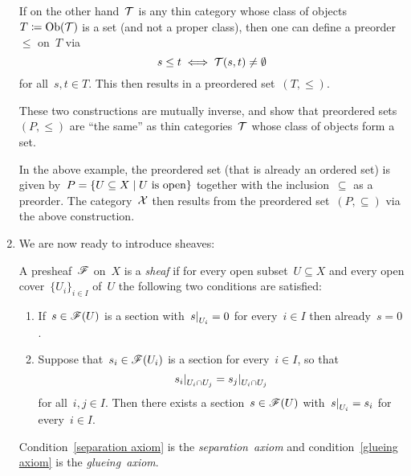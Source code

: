 \begin{example}
\begin{enumerate}
\begin{remark*}
        If on the other hand~$\mathcal{T}$ is any thin category whose class of objects~$T \coloneqq \operatorname{Ob}(\mathcal{T})$ is a set (and not a proper class), then one can define a preorder~$\leq$ on~$T$ via
        \[
                s \leq t
          \iff  \mathcal{T}(s,t) \neq \emptyset
        \]
        for all~$s, t \in T$.
        This then results in a preordered set~$(T, \leq)$.
        
        These two constructions are mutually inverse, and show that preordered sets~$(P,\leq)$ are \enquote{the same} as thin categories~$\mathcal{T}$ whose class of objects form a set.
        
        In the above example, the preordered set (that is already an ordered set) is given by~$P = \{U \subseteq X \suchthat \text{$U$ is open}\}$ together with the inclusion~$\subseteq$ as a preorder.
        The category~$\mathcal{X}$ then results from the preordered set~$(P, \subseteq)$ via the above construction.
      \end{remark*}
      
    \item
      We are now ready to introduce sheaves:
      
      \begin{definitionnonum}
        A presheaf~$\mathscr{F}$ on~$X$ is a \emph{sheaf} if for every open subset~$U \subseteq X$ and every open cover~$\{ U_i \}_{i \in I}$ of~$U$ the following two conditions are satisfied:
        \begin{enumerate}[label=(S\arabic*)]
          \item
            \label{separation axiom}
            If~$s \in \mathscr{F}(U)$ is a section with~$\restrict{s}{U_i} = 0$ for every~$i \in I$ then already~$s = 0$.
          \item
            \label{glueing axiom}
            Suppose that~$s_i \in \mathscr{F}(U_i)$ is a section for every~$i \in I$, so that
            \[
                \restrict{s_i}{U_i \cap U_j}
              = \restrict{s_j}{U_i \cap U_j}
            \]
            for all~$i, j \in I$.
            Then there exists a section~$s \in \mathscr{F}(U)$ with~$\restrict{s}{U_i} = s_i$ for every~$i \in I$.
        \end{enumerate}
        Condition~\ref*{separation axiom} is the \emph{separation~axiom} and condition~\ref*{glueing axiom} is the \emph{glueing~axiom}.
      \end{definitionnonum}
      

\end{enumerate}
\end{example}
